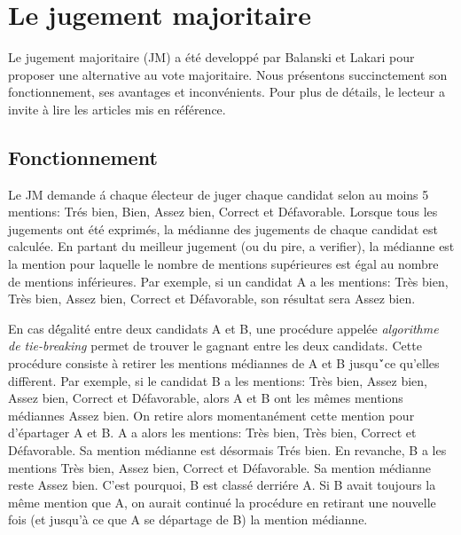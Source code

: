 \documentclass[conference]{IEEEtran}
\begin{document}



\section{Le jugement majoritaire}
\label{sec:mj}

Le jugement majoritaire (JM) a \'et\'e developp\'e par Balanski et Lakari \cite{mj} pour proposer une alternative au vote majoritaire. Nous pr\'esentons succinctement son fonctionnement, ses avantages et inconv\'enients. Pour plus de d\'etails, le lecteur a invite \`a lire les articles mis en r\'ef\'erence.


\subsection{Fonctionnement}

Le JM demande \'a chaque \'electeur de juger chaque candidat selon au moins 5 mentions: Tr\'es bien, Bien, Assez bien, Correct et D\'efavorable. Lorsque tous les jugements ont \'et\'e exprim\'es, la m\'edianne des jugements de chaque candidat est calcul\'ee. En partant du meilleur jugement (ou du pire, a verifier), la m\'edianne est la mention pour laquelle le nombre de mentions sup\'erieures est \'egal au nombre de mentions inf\'erieures. Par exemple, si un candidat A a les mentions: Tr\`es bien, Tr\`es bien, Assez bien, Correct et D\'efavorable, son r\'esultat sera Assez bien. 

En cas d\'\'egalit\'e entre deux candidats A et B, une proc\'edure appel\'ee \emph{algorithme de tie-breaking} permet de trouver le gagnant entre les deux candidats. Cette proc\'edure consiste \`a retirer les mentions m\'ediannes de A et B jusqu\'`\a ce qu'elles diff\`erent. Par exemple, si le candidat B a les mentions: Tr\`es bien, Assez bien, Assez bien, Correct et D\'efavorable, alors A et B ont les m\^emes mentions m\'ediannes Assez bien. On retire alors momentan\'ement cette mention pour d'\'epartager A et B. A a alors les mentions: Tr\`es bien, Tr\`es bien, Correct et D\'efavorable. Sa mention m\'edianne est d\'esormais Tr\'es bien. En revanche, B a les mentions Tr\`es bien, Assez bien, Correct et D\'efavorable. Sa mention m\'edianne reste Assez bien. C'est pourquoi, B est class\'e derri\'ere A. Si B avait toujours la m\^eme mention que A, on aurait continu\'e la proc\'edure en retirant une nouvelle fois (et jusqu'\`a ce que A se d\'epartage de B) la mention m\'edianne.
\end{document}
